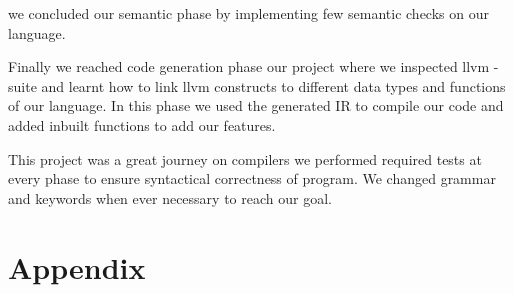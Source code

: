 \documentclass[english,a4paper,12pt]{report}
\begin{document}
we concluded our semantic phase by implementing few semantic checks on our language.
\null \par \null
Finally we reached code generation phase our project where we inspected llvm - suite 
and learnt how to link llvm constructs to different data types and functions of our
language. In this phase we used the generated IR to compile our code and added inbuilt
functions to add our features.\
\null \par \null
\noindent This project was a great journey on compilers we performed required tests at every
phase to ensure syntactical correctness of program. We changed grammar and keywords 
when ever necessary to reach our goal.

\chapter{Appendix}
\end{document}
